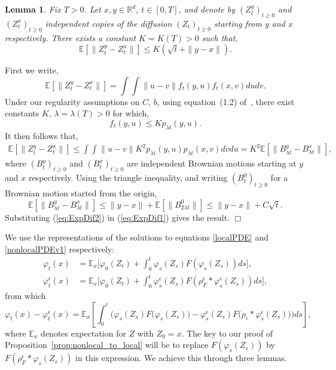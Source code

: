 \documentclass[12pt]{article}
\newenvironment {proof}{{\noindent\bf Proof }}{\hfill $\Box$ \medskip}
\newtheorem{lemma}[theorem]{Lemma}
\newcommand{\IE}{\mathbb E}
\numberwithin{equation}{section}
\begin{document}
\begin{lemma} \label{regularityForX2}
Fix $T>0$. Let $x,y \in \mathbb{R}^d$, $t \in [0,T]$, and denote by 
$(Z_t^y)_{t\geq 0}$ and $(Z_t^x)_{t\geq 0}$ independent copies of the 
diffusion $(Z_t)_{t\geq 0}$ starting 
from $y$ and $x$ respectively. There exists a constant $K=K(T)>0$ such that, 
\[ \IE[\|Z_t^y-Z_t^x\|] \leq K(\sqrt{t} + \|y-x\|). \]
\end{lemma}
\begin{proof}
First we write, 
\[ \IE[\|Z_t^y-Z_t^x\|]  = \int \int \|u-v\| f_t(y,u) f_t(x,v) du dv . \]
Under our regularity assumptions on $C$, $b$, using equation~(1.2)
of~\cite{sheu:1991}, there exist constants $K$, $\lambda =\lambda (T)>0$ 
for which,
\[ f_t(y,u) \leq K  p_{\lambda  t}(y,u). \]
It then follows that,
\begin{align}
  \IE[\|Z_t^y-Z_t^x\|]  \leq \int \int \|u-v\| K^2 p_{\lambda  t}(y,u) 
p_{\lambda  t}(x,v) dv du = K^2 \IE[\|B_{\lambda  t}^y-B_{\lambda  t}^x\|], 
\label{eq:ExpDif1}
\end{align}
where $(B_t^y)_{t\geq 0}$ and $(B_t^x)_{t\geq 0}$ are 
independent Brownian motions starting at $y$ and $x$ respectively. 
Using the triangle inequality, and writing $(B^0_t)_{t\geq 0}$ for a 
Brownian motion started from the origin,
\begin{equation}
\IE[\|B_{\lambda  t}^y-B_{\lambda  t}^x\|]
	\leq \|y-x\|+\IE[\|B^0_{2\lambda t}\|] 
\leq \|y-x\|+C\sqrt{t}. \label{eq:ExpDif2}
\end{equation}
Substituting (\ref{eq:ExpDif2}) in (\ref{eq:ExpDif1}) gives the result.
\end{proof}

We use the representations of the solutions to equations \eqref{localPDE} and \eqref{nonlocalPDEv1} respectively:
\begin{align}
\varphi_t(x) &= \IE_x\Big[\varphi_0(Z_t) 
+ \int_0^t \varphi_s(Z_s)F(\varphi_s(Z_s)) ds\Big], \label{FK:varphi} \\
\varphi^\epsilon_t(x) &= \IE_x\Big[\varphi_0(Z_t) 
+ \int_0^t \varphi^\epsilon_s(Z_s)F(\rho^\epsilon_F*\varphi^\epsilon_s(Z_s)) ds\Big],
\end{align}
from which
\begin{equation} 
\varphi_t(x) - \varphi^\epsilon_t(x) = 
\IE_x\left[ \int_0^t \Big(\varphi_s(Z_s)F\big(\varphi_s(Z_s)\big)
-\varphi^\epsilon_s(Z_s)F\big(\rho_\epsilon*\varphi^\epsilon_s(Z_s)\big)\Big) ds \right] ,
\label{FK:diferencesVarphis}
\end{equation}
where $\IE_x$ denotes expectation for $Z$ with $Z_0 = x$.
The key to our proof of Proposition~\ref{prop:nonlocal_to_local}
will be to replace $F(\varphi_s(Z_s))$ by $F(\rho^\epsilon_F*\varphi_s(Z_s))$ 
in this expression. 
We achieve this through three lemmas.
\end{document}
